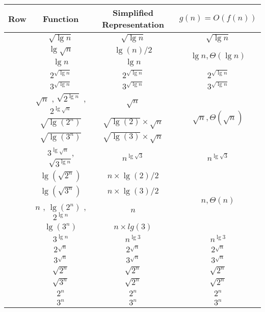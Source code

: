 \documentclass[11pt]{article}
\begin{document}
\begin{center}
	\begin{tabular}{ |c|c|c|c| } 
		\hline
		Row & Function & Simplified Representation & $g(n)=O(f(n))$\\
		\hline
		\rownumber & $\sqrt{\lg n}$ & $\sqrt{\lg n}$ & $\sqrt{\lg n}$ \\
		\hline
		\rownumber & $\lg \sqrt{n}$ & $\lg (n)/2$ & \multirow{2}{4em}{$\lg {n}, \Theta(\lg {n})$}\\ \cline{1-3}
		\rownumber & $\lg n$ & $\lg n$ & \\
		\hline
		\rownumber & $2^{\sqrt{\lg n}}$ & $2^{\sqrt{\lg n}}$ & $2^{\sqrt{\lg n}}$ \\
		\hline
		\rownumber & $3^{\sqrt{\lg n}}$ & $3^{\sqrt{\lg n}}$ & $3^{\sqrt{\lg n}}$ \\
		\hline
		\rownumber & $\sqrt{n}$ , $\sqrt{2^{\lg n}}$ , $2^{\lg \sqrt{n}}$ & $\sqrt{n}$ & \multirow{3}{4em}{$\sqrt{n}, \Theta(\sqrt{n})$}\\ \cline{1-3}
		\rownumber & $\sqrt{\lg (2^n)}$ & $\sqrt{\lg (2)} \times \sqrt{n}$ & \\ \cline{1-3}
		\rownumber & $\sqrt{\lg (3^n)}$ & $\sqrt{\lg (3)} \times \sqrt{n}$ & \\ \cline{1-3}
		\hline
		\rownumber & $3^{\lg \sqrt{n}}$ , $\sqrt{3^{\lg n}}$ & $n^{\lg \sqrt{3}}$ & $n^{\lg \sqrt{3}}$ \\
		\hline
		\rownumber & $\lg (\sqrt{2^n})$ & $n \times \lg (2)/2$ & \multirow{4}{4em}{$n, \Theta(n)$}\\ \cline{1-3}
		\rownumber & $\lg (\sqrt{3^n})$ & $n \times \lg (3)/2$ & \\ \cline{1-3}
		\rownumber & $n$ , $\lg(2^n)$ , $2^{\lg n}$ & $n$ & \\ \cline{1-3}
		\rownumber & $\lg(3^n)$ & $n \times lg (3)$ & \\ \cline{1-3}
		\hline
		\rownumber & $3^{\lg n}$ & $n^{\lg 3}$ & $n^{\lg 3}$ \\
		\hline
		\rownumber & $2^{\sqrt{n}}$ & $2^{\sqrt{n}}$ & $2^{\sqrt{n}}$ \\
		\hline
		\rownumber & $3^{\sqrt{n}}$ & $3^{\sqrt{n}}$ & $3^{\sqrt{n}}$ \\
		\hline
		\rownumber & $\sqrt{2^n}$ & $\sqrt{2^n}$ & $\sqrt{2^n}$ \\
		\hline
		\rownumber & $\sqrt{3^n}$ & $\sqrt{2^n}$ & $\sqrt{2^n}$ \\
		\hline
		\rownumber & $2^n$ & $2^n$ & $2^n$ \\
		\hline
		\rownumber & $3^n$ & $3^n$ & $3^n$ \\
		\hline
		
	\end{tabular}
\end{center}
\end{document}
